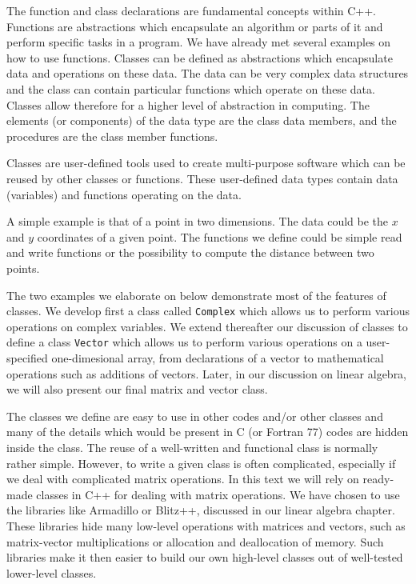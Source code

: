 The function and class declarations are fundamental concepts within C++.  Functions are abstractions
which encapsulate an algorithm or parts of it and perform specific tasks in a program. 
We have already met several examples on how to use  functions. 
Classes can be defined as abstractions which encapsulate
data and operations on these data. 
The data can be very complex data structures  and the class can contain particular functions
which operate on these data. Classes allow therefore for a higher level of abstraction in computing.
The elements (or components) of the data
type are the class data members, and the procedures are the class
member functions. 

Classes are user-defined tools used to create multi-purpose software which can be reused by other classes or functions.
These user-defined data types contain data (variables) and 
functions operating on the data.  

A simple example is that of a point in two dimensions.  
The data could be the $x$ and $y$ coordinates of a given  point. The functions
we define could be simple read and write functions or the possibility to compute the distance between two points.

The two examples we  elaborate on below demonstrate most of the features of classes. 
We develop first a class called \verb?Complex?  which allows us to perform various operations on 
complex variables.
We extend thereafter our discussion of classes to
define a class \verb?Vector? 
which allows us to perform various operations on a user-specified one-dimesional array, from
declarations of a vector to mathematical operations such as additions of vectors. Later, in our discussion on linear algebra, we will also present our final matrix and vector class.

The classes we define are easy to use in other codes and/or other classes and many of the details 
which would be present in C (or Fortran 77) codes are hidden inside
the class.  The reuse of a well-written and functional class is normally rather simple.
However, to write a given class is often complicated, especially if we deal with complicated 
matrix operations.  In this text we will rely on ready-made classes in C++  for dealing
with matrix operations.  We have chosen to use the libraries like Armadillo or Blitz++, 
discussed in our linear algebra chapter. 
These libraries hide  many low-level operations  with matrices  and vectors, such as
matrix-vector multiplications or allocation and deallocation of memory.    
Such libraries make it then easier
to build our own high-level classes out of well-tested
lower-level classes.

